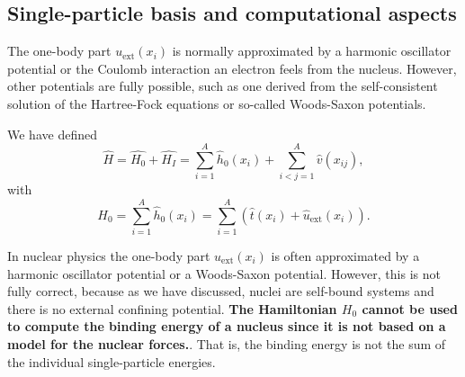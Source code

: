 \begin{itemize}
\subsection{Single-particle basis and computational aspects}

The one-body part $u_{\mathrm{ext}}(x_i)$ is normally approximated by a harmonic oscillator potential or the Coulomb interaction an electron feels from the nucleus. However, other potentials are fully possible, such as 
one derived from the self-consistent solution of the Hartree-Fock equations or so-called Woods-Saxon potentials.

We have defined
\[
    \hat{H} = \hat{H_0} + \hat{H_I} 
    = \sum_{i=1}^A \hat{h}_0(x_i) + \sum_{i<j=1}^A \hat{v}(x_{ij}),
\]
with 
\[
  H_0=\sum_{i=1}^A \hat{h}_0(x_i) =  \sum_{i=1}^A\left(\hat{t}(x_i) + \hat{u}_{\mathrm{ext}}(x_i)\right).
\]

In nuclear physics the one-body part $u_{\mathrm{ext}}(x_i)$ is often approximated by a harmonic oscillator potential or a
Woods-Saxon potential. However, this is not fully correct, because as we have discussed, nuclei are self-bound systems and there is no external confining potential. {\bf The Hamiltonian $H_0$ cannot be used to compute the binding energy of a nucleus since it is not based on a model for the nuclear forces.}. That is, the binding energy is not the sum of the individual single-particle energies. 


\end{itemize}
